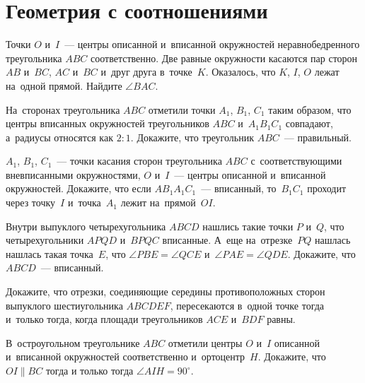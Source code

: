 
\section*{Геометрия с соотношениями}



\begin{problems}

\item
Точки $O$ и~$I$~— центры описанной и~вписанной окружностей неравнобедренного
треугольника $ABC$ соответственно.
Две равные окружности касаются пар сторон $AB$ и~$BC$, $AC$ и~$BC$ и~друг друга
в~точке~$K$.
Оказалось, что $K$, $I$, $O$ лежат на~одной прямой.
Найдите $\angle BAC$.

\item
На~сторонах треугольника $ABC$ отметили точки $A_1$, $B_1$, $C_1$ таким
образом, что центры вписанных окружностей треугольников $ABC$ и~$A_1 B_1 C_1$
совпадают, а~радиусы относятся как $2 : 1$.
Докажите, что треугольник $ABC$~— правильный.

\item
$A_1$, $B_1$, $C_1$~— точки касания сторон треугольника $ABC$
с~соответствующими вневписанными окружностями,
$O$ и~$I$~— центры описанной и~вписанной окружностей.
Докажите, что если $A B_1 A_1 C_1$~— вписанный, то~$B_1 C_1$ проходит через
точку~$I$ и~точка~$A_1$ лежит на~прямой~$OI$.

\item
Внутри выпуклого четырехугольника $ABCD$ нашлись такие точки $P$ и~$Q$,
что четырехугольники $APQD$ и~$BPQC$ вписанные.
А~еще на~отрезке~$PQ$ нашлась нашлась такая точка~$E$, что
$\angle PBE = \angle QCE$ и~$\angle PAE = \angle QDE$.
Докажите, что $ABCD$~— вписанный.

\item
Докажите, что отрезки, соединяющие середины противоположных сторон выпуклого
шестиугольника $ABCDEF$, пересекаются в~одной точке тогда и~только тогда, когда
площади треугольников $ACE$ и~$BDF$ равны.

\item
В~остроугольном треугольнике $ABC$ отметили центры $O$ и~$I$ описанной
и~вписанной окружностей соответственно и~ортоцентр~$H$.
Докажите, что $OI \parallel BC$ тогда и только тогда $\angle AIH = 90^{\circ}$.


\end{problems}
